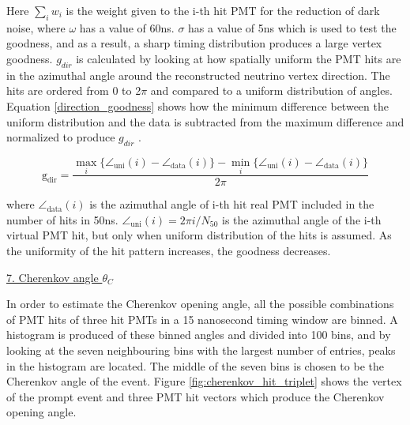 Here $\sum_{i} w_{i}$ is the weight given to the i-th hit PMT for the reduction of dark noise, where $\omega$ has a value of 60ns. $\sigma$ has a value of 5ns which is used to test the goodness, and as a result, a sharp timing distribution produces a large vertex goodness. $g_{dir}$ is calculated by looking at how spatially uniform the PMT hits are in the azimuthal angle around the reconstructed neutrino vertex direction. The hits are ordered from 0 to 2$\pi$ and compared to a uniform distribution of angles. Equation \ref{direction_goodness} shows how the minimum difference between the uniform distribution and the data is subtracted from the maximum difference and normalized to produce $g_{dir}$ .

\begin{equation}
    \mathrm{g}_{\mathrm{dir}}=\frac{\max _{i}\{\angle_{\mathrm{uni}}(i)-\angle_{\mathrm{data}}(i)\}-\min _{i}\{\angle_{\mathrm{uni}}(i)-\angle_{\mathrm{data}}(i)\}}{2 \pi}
\label{direction_goodness}
\end{equation}

where $\angle_{\mathrm{data}}(i)$ is the azimuthal angle of i-th hit real PMT included in the number of hits in 50ns. $\angle_{\mathrm{uni}}(i)=2 \pi i / N_{50}$ is the azimuthal angle of the i-th virtual PMT hit, but only when uniform distribution of the hits is assumed. As the uniformity of the hit pattern increases, the goodness decreases. 
 


\noindent
\underline{7. Cherenkov angle $\theta_{C}$}\\
\noindent

In order to estimate the Cherenkov opening angle, all the possible combinations of PMT hits of three hit PMTs in a 15 nanosecond timing window are binned. A histogram is produced of these binned angles and divided into 100 bins, and by looking at the seven neighbouring bins with the largest number of entries, peaks in the histogram are located. The middle of the seven bins is chosen to be the Cherenkov angle of the event. Figure \ref{fig:cherenkov_hit_triplet} shows the vertex of the prompt event and three PMT hit vectors which produce the Cherenkov opening angle. 

